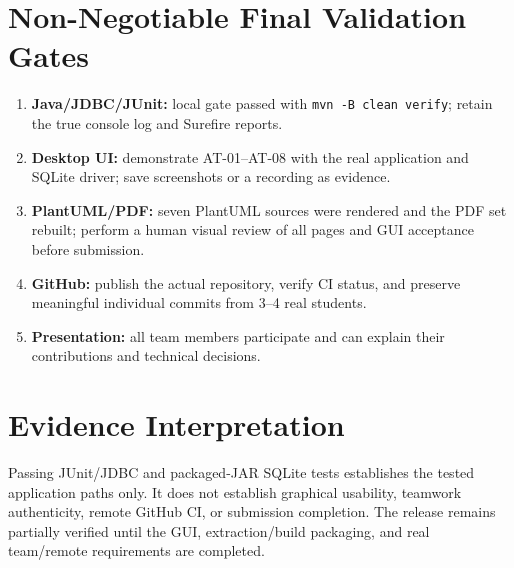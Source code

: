 \documentclass[11pt,a4paper]{article}
\begin{document}
\section{Non-Negotiable Final Validation Gates}
\begin{enumerate}
\item \textbf{Java/JDBC/JUnit:} local gate passed with \texttt{mvn -B clean verify}; retain the true console log and Surefire reports.
\item \textbf{Desktop UI:} demonstrate AT-01--AT-08 with the real application and SQLite driver; save screenshots or a recording as evidence.
\item \textbf{PlantUML/PDF:} seven PlantUML sources were rendered and the PDF set rebuilt; perform a human visual review of all pages and GUI acceptance before submission.
\item \textbf{GitHub:} publish the actual repository, verify CI status, and preserve meaningful individual commits from 3--4 real students.
\item \textbf{Presentation:} all team members participate and can explain their contributions and technical decisions.
\end{enumerate}
\section{Evidence Interpretation}
Passing JUnit/JDBC and packaged-JAR SQLite tests establishes the tested application paths only. It does not establish graphical usability, teamwork authenticity, remote GitHub CI, or submission completion. The release remains partially verified until the GUI, extraction/build packaging, and real team/remote requirements are completed.
\end{document}
